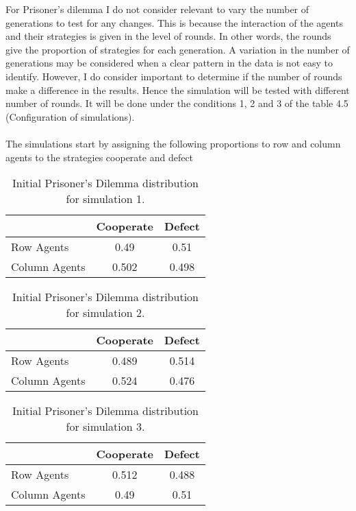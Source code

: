 \documentclass{book}
\begin{document}
\newpage

For Prisoner's dilemma I do not consider relevant to vary the number of generations to test for any changes. This is because the interaction of the agents and their strategies is given in the level of rounds. In other words, the rounds give the proportion of strategies for each generation. A variation in the number of generations may be considered when a clear pattern in the data is not easy to identify. However, I do consider important to determine if the number of rounds make a difference in the results. Hence the simulation will be tested  with different number of rounds. It will be done under the conditions 1, 2 and 3 of the table 4.5 (Configuration of simulations).
\\\\The simulations start by assigning the following proportions to row and column agents to the strategies cooperate and defect

\begin{table}[H]
\begin{center}
\begin{tabular}{|l|c|c|}
\hline
& Cooperate & Defect \\ 
\hline
Row Agents & 0.49 & 0.51\\
\hline
Column Agents & 0.502 & 0.498\\
\hline
\end{tabular}
\end{center}
\caption{ Initial Prisoner’s Dilemma distribution for simulation 1.}
\label{tab:pds1g1}
\end{table}

\begin{table}[H]
\begin{center}
\begin{tabular}{|l|c|c|}
\hline
& Cooperate & Defect \\ 
\hline
Row Agents & 0.489 & 0.514\\
\hline
Column Agents & 0.524 & 0.476\\
\hline
\end{tabular}
\end{center}
\caption{Initial Prisoner’s Dilemma distribution for simulation 2.}
\label{tab:pds2g1}
\end{table}

\begin{table}[H]
\begin{center}
\begin{tabular}{|l|c|c|}
\hline
& Cooperate & Defect \\ 
\hline
Row Agents & 0.512 & 0.488\\
\hline
Column Agents & 0.49 & 0.51\\
\hline
\end{tabular}
\end{center}
\caption{ Initial Prisoner’s Dilemma distribution for simulation 3.}
\label{tab:pds3g1}
\end{table}
\end{document}

